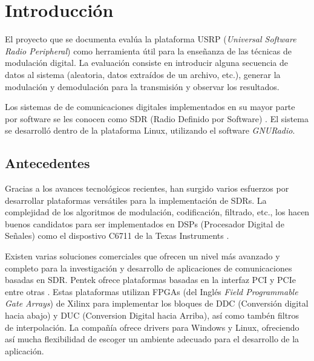 \chapter{Introducci\'on}

El proyecto que se documenta eval\'ua la plataforma USRP (\emph{Universal Software Radio Peripheral}) como herramienta \'util
para la ense\~nanza de las t\'ecnicas de modulaci\'on digital. La evaluaci\'on consiste en introducir alguna secuencia de
datos al sistema (aleatoria, datos extra\'idos de un archivo, etc.), generar la modulaci\'on y demodulaci\'on para la
transmisi\'on y observar los resultados.

Los sistemas de de comunicaciones digitales implementados en su  mayor parte por software se les conocen como SDR (Radio
Definido por Software) \cite{mitola}. El sistema se desarroll\'o dentro de la plataforma Linux, utilizando el software
\emph{GNURadio}.

\section{Antecedentes}

Gracias a los avances tecnol\'ogicos recientes, han surgido varios esfuerzos por desarrollar plataformas vers\'atiles para
la implementaci\'on de SDRs. La complejidad de los algoritmos de modulaci\'on, codificaci\'on, filtrado, etc., los hacen buenos
candidatos para ser implementados en DSPs (Procesador Digital de Se\~nales) como el dispostivo C6711 de la Texas Instruments
\cite{abendroth}.

Existen varias soluciones comerciales que ofrecen un nivel m\'as avanzado y completo para la investigaci\'on y desarrollo de
aplicaciones de comunicaciones basadas en SDR. Pentek ofrece plataformas basadas en la interfaz PCI y PCIe entre otras
\cite{pentek}. Estas plataformas utilizan FPGAs (del Ingl\'es \emph{Field Programmable Gate Arrays}) de Xilinx para implementar
los bloques de DDC (Conversi\'on digital hacia abajo) y DUC (Conversion Digital hacia Arriba), as\'i como tamb\'en filtros de
interpolaci\'on. La compa\~n\'ia ofrece drivers para Windows y Linux, ofreciendo as\'i mucha flexibilidad de escoger un
ambiente adecuado para el desarrollo de la aplicaci\'on.

